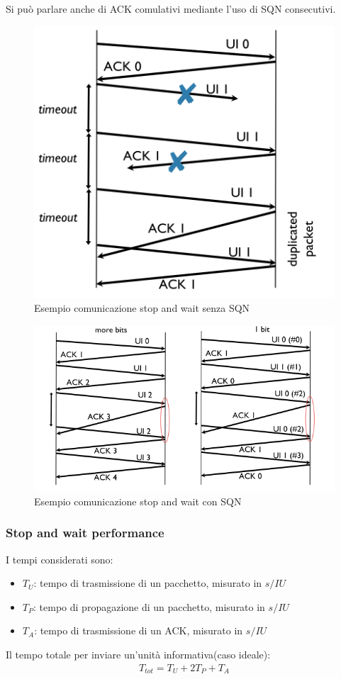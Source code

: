Si può parlare anche di ACK comulativi mediante l'uso di SQN consecutivi.

\begin{figure}[!ht]
	\centering
	\includegraphics[width=0.4\columnwidth]{./images/esempio_comunicazione_stop_wait_no_sqn.png}
	\caption{Esempio comunicazione stop and wait senza SQN}
	\label{fig:esempio_comunicazione_stop_wait_no_sqn}
\end{figure}


\begin{figure}[!ht]
	\centering
	\includegraphics[width=0.4\columnwidth]{./images/esempio_comunicazione_stop_wait_sqn.png}
	\caption{Esempio comunicazione stop and wait con SQN}
	\label{fig:esempio_comunicazione_stop_wait_sqn}
\end{figure}



\subsubsection{Stop and wait performance}

I tempi considerati sono:
\begin{itemize}
	\item \textbf{$T_U$}: tempo di trasmissione di un pacchetto, misurato in $s/IU$
	\item \textbf{$T_P$}: tempo di propagazione di un pacchetto, misurato in $s/IU$
	\item \textbf{$T_{A}$}: tempo di trasmissione di un ACK, misurato in $s/IU$
\end{itemize}

Il tempo totale per inviare un'unità informativa(caso ideale):
\begin{align}
	T_{tot} = T_{U} + 2T_{P} + T_{A}
\end{align}

